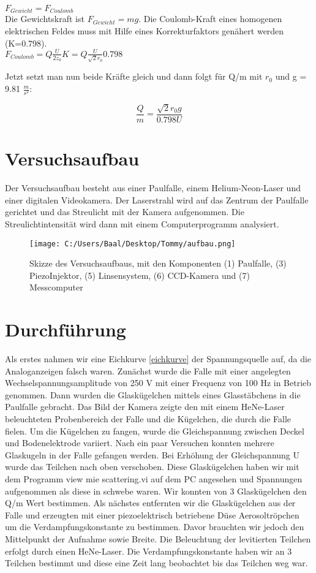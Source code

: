 \documentclass[10pt,a4paper]{article}
\begin{document}
$F_{Gewicht}=F_{Coulomb}$
	\\
Die Gewichtskraft ist $F_{Gewicht}=mg$. Die Coulomb-Kraft eines homogenen elektrischen Feldes muss mit Hilfe eines Korrekturfaktors genähert werden (K=0.798). \\

$F_{Coulomb}=Q\frac{U}{2z_0}K=Q\frac{U}{\sqrt2 r_0}0.798$

Jetzt setzt man nun beide Kräfte gleich und dann folgt für Q/m mit $r_0 $ und g = 9.81 $\frac{m}{s^2}$:

\begin{equation}
\frac{Q}{m}=\frac{\sqrt2 r_0 g}{0.798 U}
\label {7}
\end{equation}

\section{Versuchsaufbau}

Der Versuchsaufbau besteht aus einer Paulfalle, einem Helium-Neon-Laser und einer digitalen Videokamera. Der Laserstrahl wird auf das Zentrum der Paulfalle gerichtet und das Streulicht mit der Kamera aufgenommen. Die Streulichtintensität wird dann mit einem Computerprogramm analysiert.

\begin{figure}[h]
	\texttt{[image: C:/Users/Baal/Desktop/Tommy/aufbau.png]}
	\centering
	\caption{ Skizze des Versuchsaufbaus, mit den Komponenten (1) Paulfalle, (3) PiezoInjektor, (5) Linsensystem, (6) CCD-Kamera und (7) Messcomputer}
	\label{aufbau}
\end{figure}

\section{Durchführung}


Als erstes nahmen wir eine Eichkurve \ref{eichkurve} der Spannungsquelle auf, da die Analoganzeigen falsch waren. Zunächst wurde die Falle mit einer angelegten Wechselspannungsamplitude von 250 V mit
einer Frequenz von 100 Hz in Betrieb genommen. Dann wurden die Glaskügelchen mittels
eines Glasstäbchens in die Paulfalle gebracht. Das Bild der Kamera zeigte den mit
einem HeNe-Laser beleuchteten Probenbereich der Falle und die Kügelchen, die durch die
Falle fielen. Um die Kügelchen zu fangen, wurde die Gleichspannung zwischen Deckel und
Bodenelektrode variiert.
Nach ein paar Versuchen konnten mehrere Glaskugeln in der Falle gefangen werden.
Bei Erhöhung der Gleichspannung U wurde das Teilchen nach oben verschoben. Diese Glaskügelchen haben wir mit dem Programm view mie scattering.vi auf dem PC angesehen und Spannungen aufgenommen als diese in schwebe waren. Wir konnten von 3 Glaskügelchen den Q/m Wert bestimmen. Als nächstes entfernten wir die Glaskügelchen aus der Falle und erzeugten mit einer piezoelektrisch betriebene Düse Aerosoltröpchen um die Verdampfungskonstante zu bestimmen. Davor brauchten wir jedoch den Mittelpunkt der Aufnahme sowie Breite. Die Beleuchtung der levitierten Teilchen erfolgt durch einen HeNe-Laser. Die Verdampfungskonstante haben wir an 3 Teilchen bestimmt und diese eine Zeit lang beobachtet bis das Teilchen weg war.
\end{document}
